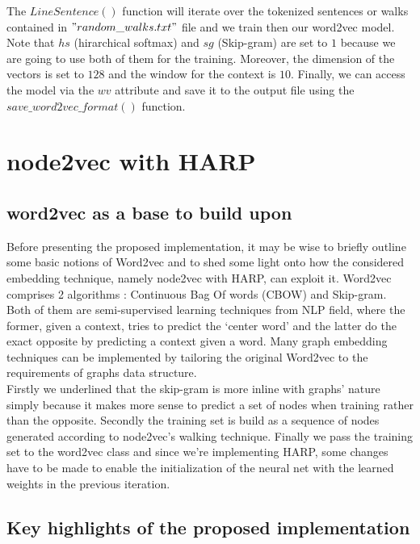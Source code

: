 \documentclass[a4paper,13pt]{article}
\begin{document}
\FloatBarrier
The $LineSentence()$ function will iterate over the tokenized sentences or walks contained in $"random\_walks.txt"$ file and we train then our word2vec model. Note that $hs$ (hirarchical softmax) and $sg$ (Skip-gram) are set to $1$ because we are going to use both of them for the training. Moreover, the dimension of the vectors is set to $128$ and the window for the context is $10$.
Finally, we can access the model via the $wv$ attribute and save it to the output file using the $save\_word2vec\_format()$ function.


\section{node2vec with HARP}
\subsection{word2vec as a base to build upon}
Before presenting the proposed implementation, it may be wise to briefly outline some basic notions of Word2vec and to shed some light onto how the considered embedding technique, namely node2vec with HARP, can exploit it. Word2vec comprises 2 algorithms : Continuous Bag Of words (CBOW) and Skip-gram. Both of them are semi-supervised learning techniques from NLP field, where the former, given a context, tries to predict the ‘center word’ and the latter do the exact opposite by predicting a context given a word. Many graph embedding techniques can be implemented by tailoring the original Word2vec to the requirements of graphs data structure.\\ 
Firstly we underlined that the skip-gram is more inline with graphs’ nature simply because it makes more sense to predict a set of nodes when training rather than the opposite. Secondly the training set is build as a sequence of nodes generated according to node2vec’s walking technique. Finally we pass the training set to the word2vec class and since we’re implementing HARP, some changes have to be made to enable the initialization of the neural net with the learned weights in the previous iteration.
\subsection{Key highlights of the proposed implementation}
\end{document}
